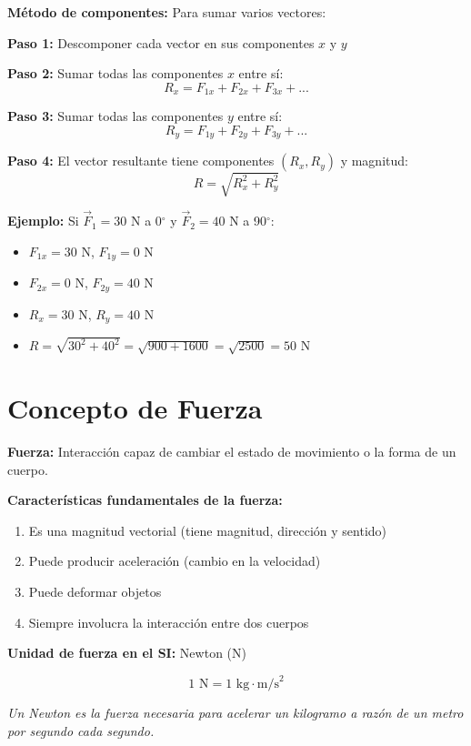\begin{seccion}
\textbf{Método de componentes:} Para sumar varios vectores:

\textbf{Paso 1:} Descomponer cada vector en sus componentes $x$ y $y$

\textbf{Paso 2:} Sumar todas las componentes $x$ entre sí:
$$R_x = F_{1x} + F_{2x} + F_{3x} + ...$$

\textbf{Paso 3:} Sumar todas las componentes $y$ entre sí:
$$R_y = F_{1y} + F_{2y} + F_{3y} + ...$$

\textbf{Paso 4:} El vector resultante tiene componentes $(R_x, R_y)$ y magnitud:
$$R = \sqrt{R_x^2 + R_y^2}$$

\vspace{0.3cm}

\textbf{Ejemplo:} Si $\vec{F}_1 = 30$ N a 0$^\circ$ y $\vec{F}_2 = 40$ N a 90$^\circ$:
\begin{itemize}
    \item $F_{1x} = 30$ N, $F_{1y} = 0$ N
    \item $F_{2x} = 0$ N, $F_{2y} = 40$ N
    \item $R_x = 30$ N, $R_y = 40$ N
    \item $R = \sqrt{30^2 + 40^2} = \sqrt{900 + 1600} = \sqrt{2500} = 50$ N
\end{itemize}
\end{seccion}

\section{Concepto de Fuerza}

\begin{seccion}

\begin{definicion}
    \textbf{Fuerza:} Interacción capaz de cambiar el estado de movimiento o la forma de un cuerpo.
\end{definicion}

\textbf{Características fundamentales de la fuerza:}
\begin{enumerate}
    \item Es una magnitud vectorial (tiene magnitud, dirección y sentido)
    \item Puede producir aceleración (cambio en la velocidad)
    \item Puede deformar objetos
    \item Siempre involucra la interacción entre dos cuerpos
\end{enumerate}

\textbf{Unidad de fuerza en el SI:} Newton (N)

$$1 \text{ N} = 1 \text{ kg} \cdot \text{m/s}^2$$

\begin{definicion}
    \textit{Un Newton es la fuerza necesaria para acelerar un kilogramo a razón de un metro por segundo cada segundo.}
\end{definicion}

\end{seccion}
\newpage
